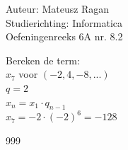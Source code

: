 \documentclass[a4paper]{article}
\begin{document}
\noindent \large Auteur: Mateusz Ragan \\
\noindent \large Studierichting: Informatica\\
\noindent \large Oefeningenreeks 6A nr. 8.2\\

\medskip

\normalsize

Bereken de term:\\

$x_7$ voor $(-2,4,-8,...)$\\

$q = 2$\\

$x_n = x_1 \cdot q_{n-1}$\\

$x_7 = -2 \cdot (-2)^6 = -128$

\begin{thebibliography}{999}
\end{thebibliography}
\end{document}
